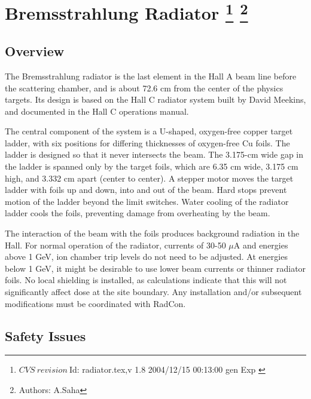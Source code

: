 \section[Bremsstrahlung Radiator]{Bremsstrahlung Radiator
\footnote{
  $CVS~revision~ $Id: radiator.tex,v 1.8 2004/12/15 00:13:00 gen Exp $ $
}
\footnote{Authors: A.Saha }
}

\subsection{Overview}

The Bremsstrahlung radiator is the last element in the Hall A beam line 
before the scattering chamber, and is about 72.6 cm from the center 
of the physics targets.
Its design is based on the Hall C radiator 
system built by David Meekins, and documented in the Hall C operations
manual.

The central component of the system is a U-shaped, oxygen-free copper target
ladder, with six positions for differing thicknesses of oxygen-free Cu foils.
The ladder is designed so that it never intersects the beam.
The 3.175-cm wide gap in the ladder is spanned only by 
the target foils, which are 6.35 cm wide, 3.175 cm high,
and 3.332 cm apart (center to center).
A stepper motor moves the target ladder with foils up and down,
into and out of the beam.
Hard stops prevent motion of the ladder beyond the limit switches.
Water cooling of the radiator ladder cools the foils, preventing
damage from overheating by the beam.

The interaction of the beam with the foils produces
background radiation in the Hall.
For normal operation of the radiator, currents of 30-50 $\mu$A and energies 
above 1 GeV, ion chamber trip levels do not need to be adjusted. At energies 
below 1 GeV, it might be desirable to use lower beam currents or thinner 
radiator foils. 
No local shielding is installed, as calculations indicate
that this will not significantly affect dose at the site boundary.
Any installation and/or subsequent modifications must be coordinated
with RadCon.

\begin{safetyen}{10}{10}
\subsection{Safety Issues}
\end{safetyen}


